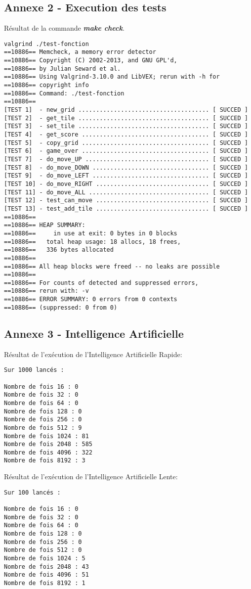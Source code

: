 \documentclass[a4paper]{article}
\begin{document}
\subsection{Annexe 2 - Execution des tests}
\label{sec-7-2}
\noindent
Résultat de la commande \textbf{\emph{make check}}.

\begin{verbatim}
valgrind ./test-fonction
==10886== Memcheck, a memory error detector
==10886== Copyright (C) 2002-2013, and GNU GPL'd, 
==10886== by Julian Seward et al.
==10886== Using Valgrind-3.10.0 and LibVEX; rerun with -h for
==10886== copyright info
==10886== Command: ./test-fonction
==10886== 
[TEST 1]  - new_grid ..................................... [ SUCCED ]
[TEST 2]  - get_tile ..................................... [ SUCCED ]
[TEST 3]  - set_tile ..................................... [ SUCCED ]
[TEST 4]  - get_score .................................... [ SUCCED ]
[TEST 5]  - copy_grid .................................... [ SUCCED ]
[TEST 6]  - game_over .................................... [ SUCCED ]
[TEST 7]  - do_move_UP ................................... [ SUCCED ]
[TEST 8]  - do_move_DOWN ................................. [ SUCCED ]
[TEST 9]  - do_move_LEFT ................................. [ SUCCED ]
[TEST 10] - do_move_RIGHT ................................ [ SUCCED ]
[TEST 11] - do_move_ALL .................................. [ SUCCED ]
[TEST 12] - test_can_move ................................ [ SUCCED ]
[TEST 13] - test_add_tile ................................ [ SUCCED ]
==10886== 
==10886== HEAP SUMMARY:
==10886==     in use at exit: 0 bytes in 0 blocks
==10886==   total heap usage: 18 allocs, 18 frees, 
==10886==   336 bytes allocated
==10886== 
==10886== All heap blocks were freed -- no leaks are possible
==10886== 
==10886== For counts of detected and suppressed errors,
==10886== rerun with: -v
==10886== ERROR SUMMARY: 0 errors from 0 contexts
==10886== (suppressed: 0 from 0)
\end{verbatim}
\newpage
\subsection{Annexe 3 - Intelligence Artificielle}
\label{sec-7-3}
\noindent
Résultat de l'exécution de l'Intelligence Artificielle Rapide:
\begin{verbatim}
Sur 1000 lancés :

Nombre de fois 16 : 0
Nombre de fois 32 : 0
Nombre de fois 64 : 0
Nombre de fois 128 : 0
Nombre de fois 256 : 0
Nombre de fois 512 : 9
Nombre de fois 1024 : 81
Nombre de fois 2048 : 585
Nombre de fois 4096 : 322
Nombre de fois 8192 : 3
\end{verbatim}

\noindent
Résultat de l'exécution de l'Intelligence Artificielle Lente:
\begin{verbatim}
Sur 100 lancés : 

Nombre de fois 16 : 0
Nombre de fois 32 : 0
Nombre de fois 64 : 0
Nombre de fois 128 : 0
Nombre de fois 256 : 0
Nombre de fois 512 : 0
Nombre de fois 1024 : 5
Nombre de fois 2048 : 43
Nombre de fois 4096 : 51
Nombre de fois 8192 : 1
\end{verbatim}
\end{document}
